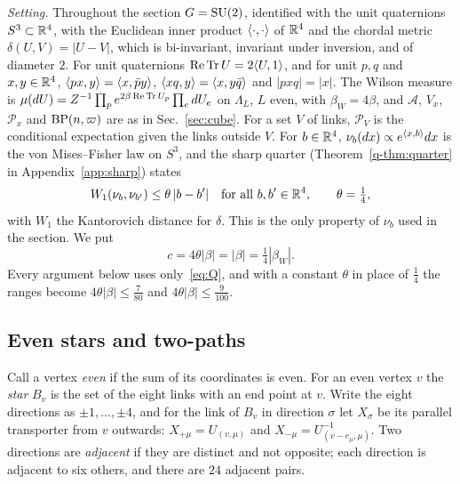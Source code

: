\emph{Setting.} Throughout the section $G=\mathrm{SU}(2)$, identified with the unit
quaternions $S^3\subset\mathbb{R}^4$, with the Euclidean inner product
$\langle \cdot,\cdot\rangle$ of $\mathbb{R}^4$ and the chordal metric $\delta(U,V)=|U-V|$, which is
bi-invariant, invariant under inversion, and of diameter $2$. For unit
quaternions $\operatorname{Re}\operatorname{Tr} U=2\langle U,1\rangle$, and for unit $p,q$ and $x,y\in\mathbb{R}^4$,
$\langle px,y\rangle=\langle x,\bar py\rangle$, $\langle xq,y\rangle=\langle x,y\bar q\rangle$ and $|pxq|=|x|$. The
Wilson measure is $\mu(dU)=Z^{-1}\prod_pe^{2\beta\operatorname{Re}\operatorname{Tr} U_p}\prod_edU_e$ on
$\Lambda_L$, $L$ even, with $\beta_W=4\beta$, and $\mathcal A$, $V_x$,
$\mathcal P_x$ and $\mathrm{BP}(n,\varpi)$ are as in Sec.~\ref{sec:cube}. For a set
$V$ of links, $\mathcal P_V$ is the conditional expectation given the links
outside $V$. For $b\in\mathbb{R}^4$, $\nu_b(dx)\propto e^{\langle x,b\rangle}dx$ is the von
Mises--Fisher law on $S^3$, and the sharp quarter (Theorem~\ref{q-thm:quarter}
in Appendix~\ref{app:sharp}) states
\begin{equation}\label{eq:Q}
W_1(\nu_b,\nu_{b'})\le\theta\,|b-b'|\quad\text{for all }b,b'\in\mathbb{R}^4,
\qquad\theta=\tfrac14,
\end{equation}
with $W_1$ the Kantorovich distance for $\delta$. This is the only property of
$\nu_b$ used in the section. We put
\[
c=4\theta|\beta|=|\beta|=\tfrac14|\beta_W| .
\]
Every argument below uses only~\eqref{eq:Q}, and with a constant $\theta$ in
place of $\frac14$ the ranges become $4\theta|\beta|\le\frac7{80}$ and
$4\theta|\beta|\le\frac9{100}$.

\subsection{Even stars and two-paths}

Call a vertex \emph{even} if the sum of its coordinates is even. For an even
vertex $v$ the \emph{star} $B_v$ is the set of the eight links with an end
point at $v$. Write the eight directions as $\pm1,\dots,\pm4$, and for the link
of $B_v$ in direction $\sigma$ let $X_\sigma$ be its parallel transporter from
$v$ outwards: $X_{+\mu}=U_{(v,\mu)}$ and $X_{-\mu}=U_{(v-e_\mu,\mu)}^{-1}$. Two
directions are \emph{adjacent} if they are distinct and not opposite; each
direction is adjacent to six others, and there are $24$ adjacent pairs.

